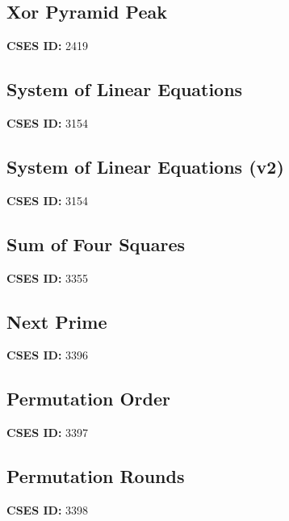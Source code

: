 \documentclass[10pt, a4paper, twocolumn, landscape]{article}
\begin{document}
\subsection{Xor Pyramid Peak}
\textbf{CSES ID:} 2419 \\

\vspace{0.2cm}
\subsection{System of Linear Equations}
\textbf{CSES ID:} 3154 \\

\vspace{0.2cm}
\subsection{System of Linear Equations (v2)}
\textbf{CSES ID:} 3154 \\

\vspace{0.2cm}
\subsection{Sum of Four Squares}
\textbf{CSES ID:} 3355 \\

\vspace{0.2cm}
\subsection{Next Prime}
\textbf{CSES ID:} 3396 \\

\vspace{0.2cm}
\subsection{Permutation Order}
\textbf{CSES ID:} 3397 \\

\vspace{0.2cm}
\subsection{Permutation Rounds}
\textbf{CSES ID:} 3398 \\

\vspace{0.2cm}
\end{document}
